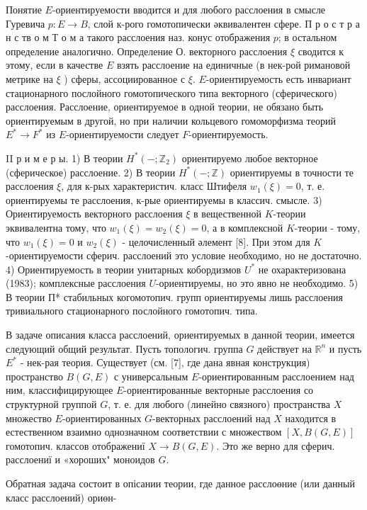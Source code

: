 \documentclass[10pt]{article}
\begin{document}
Понятие $E$-ориентируемости вводится и для любого расслоения в смысле Гуревича $p: E \rightarrow B$, слой к-рого гомотопически әквивалентен сфере. П р о с т р а н с тв о м Т о м а такого расслоения наз. конус отображения $p$; в остальном определение аналогично. Определение О. векторного расслоения $\xi$ сводится к этому, если в качестве $E$ взять расслоение на единичные (в нек-рой римановой метрике на $\xi$ ) сферы, ассоциированное с $\xi$. $E$-ориентируемость есть инвариант стационарного послойного гомотопического типа векторного (сферического) расслоения. Расслоение, ориентируемое в одной теории, не обязано быть ориентируемым в другой, но при наличии кольцевого гомоморфизма теорий $E^{*} \rightarrow F^{*}$ из $E$-ориентируемости следует $F$-ориентируемость.

II р и м е р ы. 1) В теории $H^{*}\left(-; \mathbb{Z}_{2}\right)$ ориентируемо любое векторное (сферическое) расслоение. 2) В теории $H^{*}(-; \mathbb{Z})$ ориентируемы в точности те расслоения $\xi$, для к-рых характеристич. класс Штифеля $w_{1}(\xi)=0$, т. е. ориентируемы те расслоения, к-рые ориентируемы в классич. смысле. 3) Ориентируемость векторного расслоения $\xi$ в вещественной $K$-теории эквивалентна тому, что $w_{1}(\xi)=w_{2}(\xi)=0$, а в комплексной $K$-теории - тому, что $w_{1}(\xi)=0$ и $w_{2}(\xi)$ - целочисленный әлемент [8]. При этом для $K$-ориентируемости сферич. расслоений это условие необходимо, но не достаточно. 4) Ориентируемость в теории унитарных кобордизмов $U^{*}$ не охарактеризована (1983); комплексные расслоения $U$-ориентируемы, но это явно не необходимо. 5) В теории П* стабильных когомотопич. групп ориентируемы лишь расслоения тривиального стационарного послойного гомотопич. типа.

В задаче описания класса расслоений, ориентируемых в данной теории, имеется следующий общий результат. Пусть топологич. группа $G$ действует на $\mathbb{R}^{n}$ и пусть $E^{*}$ - нек-рая теория. Существует (см. [7], где дана явная конструкция) пространство $B(G, E)$ с универсальным $E$-ориентированным расслоением над ним, классифицирующее $E$-ориентированные векторные расслоения со структурной группой $G$, т. е. для любого (линейно связного) пространства $X$ множество $E$-ориентированных $G$-векторных расслоений над $X$ находится в естественном взаимно однозначном соответствии с множеством $[X, B(G, E)]$ гомотопич. классов отображениї $X \rightarrow B(G, E)$. Это же верно для сферич. расслоениї и «хороших" моноидов $G$.

Обратная задача состоит в опісании теории, где данное расслоөние (или данный класс расслоений) ориөн-
\end{document}
